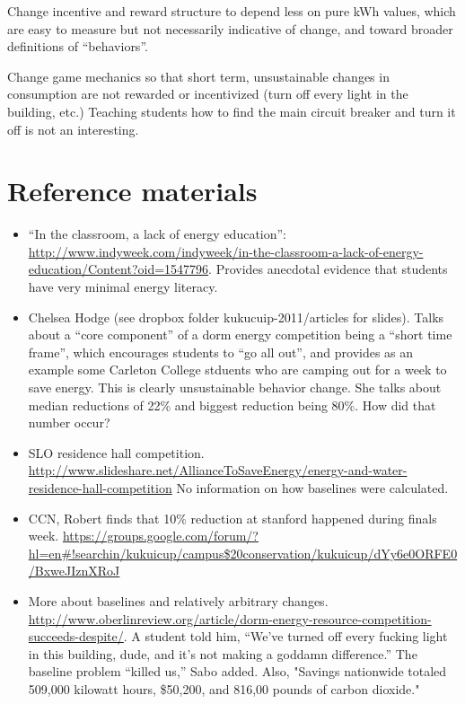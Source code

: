 \documentclass[jou]{apa} %
\begin{document}
Change incentive and reward structure to depend less on pure kWh values, which are easy to
measure but not necessarily indicative of change, and toward broader definitions of
``behaviors''.

Change game mechanics so that short term, unsustainable changes in consumption are not
rewarded or incentivized (turn off every light in the building, etc.)   Teaching students
how to find the main circuit breaker and turn it off is not an interesting. 


\section{Reference materials}

\begin{itemize}

\item ``In the classroom, a lack of energy education'':
\url{http://www.indyweek.com/indyweek/in-the-classroom-a-lack-of-energy-education/Content?oid=1547796}.
Provides anecdotal evidence that students have very minimal energy literacy.

\item Chelsea Hodge (see dropbox folder kukucuip-2011/articles for slides).  Talks about a
  ``core component'' of a dorm energy competition being a ``short time frame'', which
  encourages students to ``go all out'', and provides as an example some Carleton College
  stduents who are camping out for a week to save energy.  This is clearly unsustainable
  behavior change. She talks about median reductions of 22\% and biggest reduction being
  80\%.  How did that number occur?

\item SLO residence hall competition.
\url{http://www.slideshare.net/AllianceToSaveEnergy/energy-and-water-residence-hall-competition}
No information on how baselines were calculated. 

\item CCN, Robert finds that 10\% reduction at stanford happened during finals week.
\url{https://groups.google.com/forum/?hl=en#!searchin/kukuicup/campus$20conservation/kukuicup/dYy6e0ORFE0/BxweJIznXRoJ}

\item More about baselines and relatively arbitrary changes.
\url{http://www.oberlinreview.org/article/dorm-energy-resource-competition-succeeds-despite/}.
A student told him, “We’ve turned off every fucking light in this building, dude, and it’s
not making a goddamn difference.” The baseline problem “killed us,” Sabo added.  Also, "Savings nationwide totaled 509,000 kilowatt hours, \$50,200, and 816,00 pounds of carbon dioxide."


\end{itemize}
\end{document}
